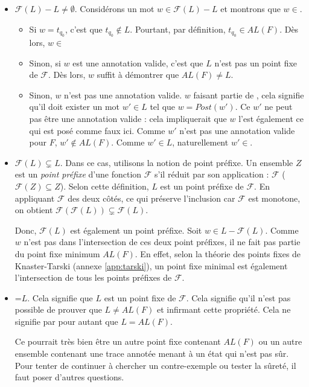 \begin{itemize}
  \item $\mathcal{F}(L)-L\neq\emptyset$. Considérons un mot $w\in\mathcal{F}(L)-L$ et montrons que $w\in$\alfx.
  \begin{itemize}
    \item Si $w=t_{q_0}$, c'est que $t_{q_0}\notin L$. Pourtant, par définition, $t_{q_0}\in AL(F)$. Dès lors, $w\in$\alfx
    \item Sinon, si $w$ est une annotation valide, c'est que $L$ n'est pas un point fixe de $\mathcal{F}$. Dès lors, $w$ suffit à démontrer que $AL(F)\neq L$.
    \item Sinon, $w$ n'est pas une annotation valide. $w$ faisant partie de \fl, cela signifie qu'il doit exister un mot $w'\in L$ tel que $w=Post(w')$. Ce $w'$ ne peut pas être une annotation valide : cela impliquerait que $w$ l'est également ce qui est posé comme faux ici. Comme $w'$ n'est pas une annotation valide pour $F$, $w'\notin AL(F)$. Comme $w'\in L$, naturellement $w'\in$\alfx.
  \end{itemize}
  \item $\mathcal{F}(L)\subsetneq L$. Dans ce cas, utilisons la notion de point préfixe. Un ensemble $Z$ est un \emph{point préfixe} d'une fonction $\mathcal{F}$ s'il réduit par son application : $\mathcal{F}$ ($\mathcal{F}(Z)\subseteq Z$). Selon cette définition, $L$ est un point préfixe de $\mathcal{F}$.
  En appliquant $\mathcal{F}$ des deux côtés, ce qui préserve l'inclusion car $\mathcal{F}$ est monotone, on obtient $\mathcal{F}(\mathcal{F}(L))\subsetneq\mathcal{F}(L)$.

  Donc, $\mathcal{F}(L)$ est également un point préfixe. Soit $w\in L-\mathcal{F}(L)$. Comme $w$ n'est pas dans l'intersection de ces deux point préfixes, il ne fait pas partie du point fixe minimum $AL(F)$. En effet, selon la théorie des points fixes de Knaster-Tarski (annexe \ref{app:tarski}), un point fixe minimal est également l'intersection de tous les points préfixes de $\mathcal{F}$.

  \item \fl=$L$. Cela signifie que $L$ est un point fixe de $\mathcal{F}$. Cela signifie qu'il n'est pas possible de prouver que $L\neq AL(F)$ et infirmant cette propriété. Cela ne signifie par pour autant que $L=AL(F)$.

  Ce pourrait très bien être un autre point fixe contenant $AL(F)$ ou un autre ensemble contenant une trace annotée menant à un état qui n'est pas sûr. Pour tenter de continuer à chercher un contre-exemple ou tester la sûreté, il faut poser d'autres questions.

\end{itemize}

